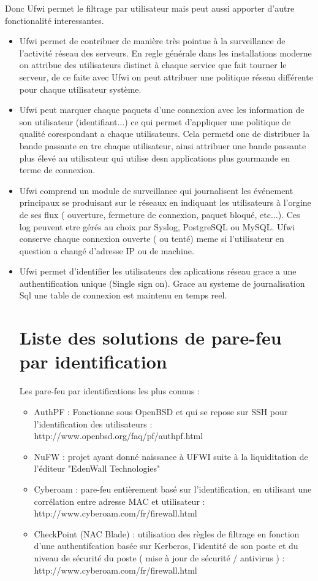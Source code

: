 \documentclass[12pt]{report}
\begin{document}
\newpage
Donc Ufwi permet le filtrage par utilisateur mais peut aussi apporter d'autre fonctionalité interessantes.\newline
\begin{itemize}
    \item Ufwi permet de contribuer de manière très pointue à la surveillance de l'activité réseau des serveurs. En regle générale dans les installations moderne on attribue des utilisateurs distinct à chaque service que fait tourner le serveur, de ce faite avec Ufwi on peut attribuer une politique réseau différente pour chaque utilisateur système.\newline
    \item Ufwi peut marquer chaque paquets d'une connexion avec les information de son utilisateur (identifiant...) ce qui permet d'appliquer une politique de qualité corespondant a chaque utilisateurs. Cela permetd onc de distribuer la bande passante en tre chaque utilisateur, ainsi attribuer une bande passante plus élevé au utilisateur qui utilise desn applications plus gourmande en terme de connexion.\newline
    \item Ufwi comprend un module de surveillance qui journalisent les événement principaux se produisant sur le réseaux en indiquant les utilisateurs à l'orgine de ses flux ( ouverture, fermeture de connexion, paquet bloqué, etc...). Ces log peuvent etre gérés au choix par Syslog, PostgreSQL ou MySQL. Ufwi conserve chaque connexion ouverte ( ou tenté) meme si l'utilisateur en question a changé d'adresse IP ou de machine.\newline
    \item Ufwi permet d'identifier les utilisateurs des aplications réseau grace a une authentification unique (Single sign on). Grace au systeme de journalisation Sql une table de connexion est maintenu en temps reel.  
\chapter{Liste des solutions de pare-feu par identification}
Les pare-feu par identifications les plus connus : 
  \begin{itemize}
    \item AuthPF : Fonctionne sous OpenBSD et qui se repose sur SSH pour l'identification des utilisateurs : http://www.openbsd.org/faq/pf/authpf.html
    \item NuFW : projet ayant donné naissance à UFWI suite à la liquiditation de l'éditeur "EdenWall Technologies"
    \item Cyberoam : pare-feu entièrement basé sur l'identification, en utilisant une corrélation entre adresse MAC et utilisateur : http://www.cyberoam.com/fr/firewall.html
    \item CheckPoint (NAC Blade) : utilisation des règles de filtrage en fonction d'une authentifcation basée sur Kerberos, l'identité de son poste et du niveau de sécurité du poste ( mise à jour de sécurité / antivirus ) : http://www.cyberoam.com/fr/firewall.html
    

\end{itemize}
\end{itemize}
\end{document}

